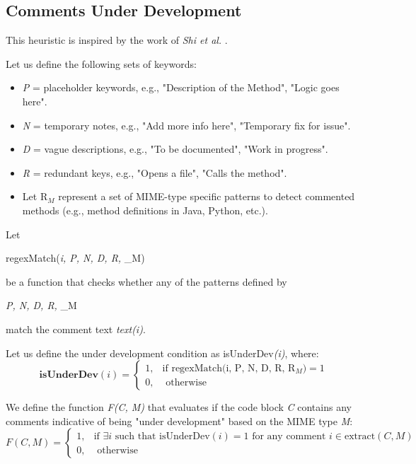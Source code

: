\subsection{Comments Under Development}
This heuristic is inspired by the work of \textit{Shi et al.} \cite{buildingRock}.

\noindent Let us define the following sets of keywords:
	\begin{itemize}
		\item \textit{P} = placeholder keywords, e.g., "Description of the Method", "Logic goes here".
		\item \textit{N} = temporary notes, e.g., "Add more info here", "Temporary fix for issue".
		\item \textit{D} = vague descriptions, e.g., "To be documented", "Work in progress".
		\item \textit{R} = redundant keys, e.g., "Opens a file", "Calls the method".
		\item Let $\mathrm{R}_{M}$ represent a set of MIME-type specific patterns to detect commented methods (e.g., method definitions in Java, Python, etc.).
	\end{itemize}
	
\noindent Let\begin{math*}
	regexMatch(\textit{i, P, N, D, R, } _{M})
\end{math*} be a function that checks whether any of the patterns defined by \begin{math*}\textit{P, N, D, R, } _{M} \end{math*} match the comment text \textit{text(i)}.

\noindent Let us define the under development condition as isUnderDev\textit{(i)}, where:
\begin{equation*}
	\textbf{isUnderDev}(i) = \begin{cases}
		1, & \text{if } \text{regexMatch(i, P, N, D, R, }  \mathrm{R}_{M}) = 1 \\
		0, & \text{ otherwise}
	\end{cases}
\end{equation*}

\noindent We define the function \textit{F(C, M)} that evaluates if the code block \textit{C} contains any comments indicative of being "under development" based on the MIME type \textit{M}:
\begin{equation*}
	F(C, M) = \begin{cases}
		1, & \text{if } \exists i \text{ such that } \text{isUnderDev}(i) = 1 \text{ for any comment } i \in \text{extract}(C, M) \\
		0, & \text{ otherwise}
	\end{cases}
\end{equation*}

